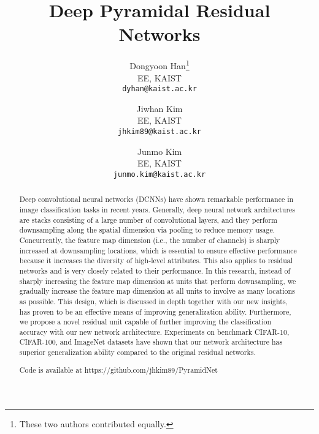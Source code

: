 \documentclass[10pt,twocolumn,letterpaper]{article}
\begin{document}
\title{Deep Pyramidal Residual Networks}

\author{Dongyoon Han\thanks{These two authors contributed equally.}\\
EE, KAIST\\
{\tt\small dyhan@kaist.ac.kr}
\and
Jiwhan Kim\footnotemark[1]\\
EE, KAIST\\
{\tt\small jhkim89@kaist.ac.kr}
\and
Junmo Kim\\
EE, KAIST\\
{\tt\small junmo.kim@kaist.ac.kr}
}
\maketitle


\begin{abstract}
 Deep convolutional neural networks (DCNNs) have shown remarkable performance in image classification tasks in recent years. Generally, deep neural network architectures are stacks consisting of a large number of convolutional layers, and they perform downsampling along the spatial dimension via pooling to reduce memory usage. Concurrently, the feature map dimension (i.e., the number of channels) is sharply increased at downsampling locations, which is essential to ensure effective performance because it increases the diversity of high-level attributes. This also applies to residual networks and is very closely related to their performance. In this research, instead of sharply increasing the feature map dimension at units that perform downsampling, we gradually increase the feature map dimension at all units to involve as many locations as possible. This design, which is discussed in depth together with our new insights, has proven to be an effective means of improving generalization ability. Furthermore, we propose a novel residual unit capable of further improving the classification accuracy with our new network architecture. Experiments on benchmark CIFAR-10, CIFAR-100, and ImageNet datasets have shown that our network architecture has superior generalization ability compared to the original residual networks.

 {\small Code is available at https://github.com/jhkim89/PyramidNet}
\end{abstract}
\end{document}
